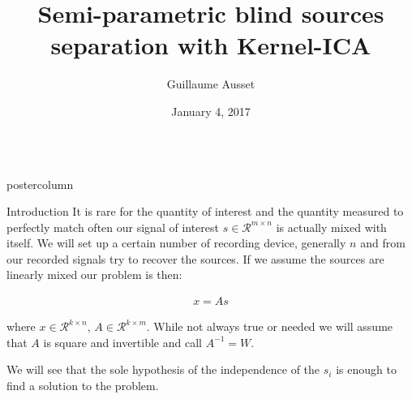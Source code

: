\documentclass{beamer}
\title{Semi-parametric blind sources separation with \huge Kernel-ICA}
\author{Guillaume Ausset}
\institute[MASH]{Université Paris Dauphine}
\date{January 4, 2017}
\newlength{\columnheight}
\begin{document}
\begin{frame}
\begin{columns}
	\begin{column}{.5\textwidth}
		\begin{beamercolorbox}[center]{postercolumn}
			\begin{minipage}{.98\textwidth}  %
				\parbox[t][\columnheight]{\textwidth}{ %
					\begin{myblock}{Introduction}
					It is rare for the quantity of interest and the quantity measured to perfectly match often our signal of interest $s \in \mathcal{R}^{m \times n}$ is actually mixed with itself. We will set up a certain number of recording device, generally $n$ and from our recorded signals try to recover the sources. If we assume the sources are linearly mixed our problem is then:

						\begin{align*}
							x = A s
						\end{align*}

						where $x \in \mathcal{R}^{k \times n}$, $A \in \mathcal{R}^{k \times m}$. While not always true or needed we will assume that $A$ is square and invertible and call $A^{-1} = W$.

						We will see that the sole hypothesis of the independence of the $s_i$ is enough to find a solution to the problem.


\end{myblock}}
\end{minipage}
\end{beamercolorbox}
\end{column}
\end{columns}
\end{frame}
\end{document}

